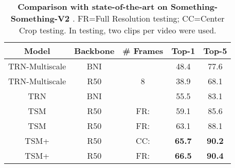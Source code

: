 \documentclass[runningheads]{llncs}
\begin{document}
\begin{table*}[h]
	\centering
	\begin{tabular}{c|c|c|c|c}
		\toprule
		{\bf Model } & {\bf Backbone }
		& {\bf \# Frames } & {\bf Top-1 } & {\bf Top-5 } \\
		\midrule
		TRN-Multiscale \cite{zhou2018temporal} & BNI &   & 48.4 & 77.6\\
 		TRN-Multiscale \cite{zhou2018temporal} & R50 & 8 & 38.9 & 68.1\\
		TRN \cite{zhou2018temporal} & BNI &  &55.5 & 83.1\\
		\midrule
		TSM \cite{lin2019tsm} & R50 & FR:  & 59.1 & 85.6\\
		TSM \cite{lin2019tsm} & R50 & FR:  & 63.1 & 88.1\\
		\midrule
		TSM+{\bf \shortname{}}
		& R50 & CC:  &\bf 65.7 &\bf 90.2 \\
		TSM+{\bf \shortname{}}
		& R50 & FR:  &\bf 66.5 &\bf 90.4 \\		
		\bottomrule
	\end{tabular}
	\vspace{.1cm}
	\caption{
	{\bf Comparison with state-of-the-art on Something-Something-V2 \cite{mahdisoltani2018fine}}. 
	FR=Full Resolution testing;
	CC=Center Crop testing.
	In testing, two clips per video were used.
	}
	\label{table:SSV2}
\end{table*}
\end{document}
